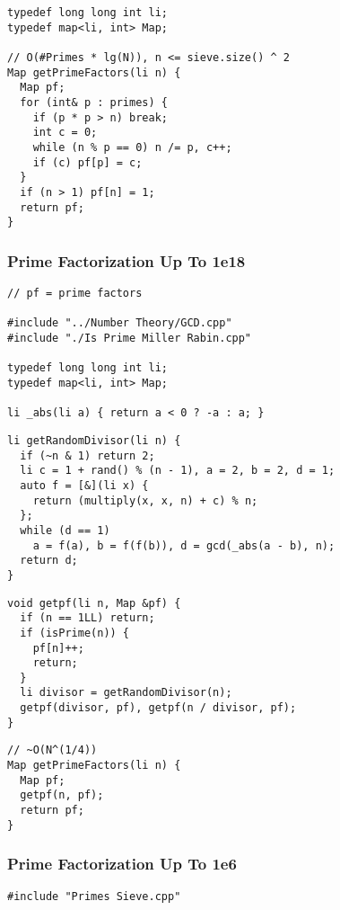 \documentclass[twoside]{article}
\newcommand{\fileTitleStyle}{\large\underline}
\begin{document}
\begin{multicols*}{2}
\begin{verbatim}
typedef long long int li;
typedef map<li, int> Map;

// O(#Primes * lg(N)), n <= sieve.size() ^ 2
Map getPrimeFactors(li n) {
  Map pf;
  for (int& p : primes) {
    if (p * p > n) break;
    int c = 0;
    while (n % p == 0) n /= p, c++;
    if (c) pf[p] = c;
  }
  if (n > 1) pf[n] = 1;
  return pf;
}
\end{verbatim}

\subsubsectionfont{\centering\bfseries\Large}
\subsubsectionfont{\fileTitleStyle}
\subsubsection*{Prime Factorization Up To 1e18}
\begin{verbatim}
// pf = prime factors

#include "../Number Theory/GCD.cpp"
#include "./Is Prime Miller Rabin.cpp"

typedef long long int li;
typedef map<li, int> Map;

li _abs(li a) { return a < 0 ? -a : a; }
\end{verbatim}
\vspace{-12pt}
\begin{verbatim}
li getRandomDivisor(li n) {
  if (~n & 1) return 2;
  li c = 1 + rand() % (n - 1), a = 2, b = 2, d = 1;
  auto f = [&](li x) {
    return (multiply(x, x, n) + c) % n;
  };
  while (d == 1)
    a = f(a), b = f(f(b)), d = gcd(_abs(a - b), n);
  return d;
}
\end{verbatim}
\vspace{-12pt}
\begin{verbatim}
void getpf(li n, Map &pf) {
  if (n == 1LL) return;
  if (isPrime(n)) {
    pf[n]++;
    return;
  }
  li divisor = getRandomDivisor(n);
  getpf(divisor, pf), getpf(n / divisor, pf);
}
\end{verbatim}
\vspace{-12pt}
\begin{verbatim}
// ~O(N^(1/4))
Map getPrimeFactors(li n) {
  Map pf;
  getpf(n, pf);
  return pf;
}
\end{verbatim}

\subsubsectionfont{\centering\bfseries\Large}
\subsubsectionfont{\fileTitleStyle}
\subsubsection*{Prime Factorization Up To 1e6}
\begin{verbatim}
#include "Primes Sieve.cpp"


\end{verbatim}
\end{multicols*}
\end{document}
